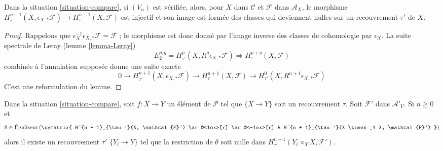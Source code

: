 \begin{lemma}
\label{lemma-V-implies-cohomology-extra-general}
Dans la situation \ref{situation-compare}, si $(V_n)$ est vérifiée, alors,
pour $X$ dans $\mathcal{C}$ et $\mathcal{F}$ dans $\mathcal{A}_X$, le morphisme
$H^{n + 1}_{\tau'}(X, \epsilon_{X, *}\mathcal{F}) \to
H^{n + 1}_\tau(X, \mathcal{F})$
est injectif et son image est formée des classes qui deviennent nulles sur
un recouvrement $\tau'$ de $X$.
\end{lemma}

\begin{proof}
Rappelons que $\epsilon_X^{-1}\epsilon_{X, *}\mathcal{F} = \mathcal{F}$ ;
le morphisme est donc donné par l'image inverse des classes de cohomologie
par $\epsilon_X$. La suite spectrale de Leray
(lemme \ref{lemma-Leray})
$$
E_2^{p, q} = H^p_{\tau'}(X, R^q\epsilon_{X, *}\mathcal{F})
\Rightarrow
H^{p + q}_\tau(X, \mathcal{F})
$$
combinée à l'annulation supposée donne une suite exacte
$$
0 \to
H^{n + 1}_{\tau'}(X, \epsilon_{X, *}\mathcal{F}) \to
H^{n + 1}_\tau(X, \mathcal{F}) \to
H^0_{\tau'}(X, R^{n + 1}\epsilon_{X, *}\mathcal{F})
$$
C'est une reformulation du lemme.
\end{proof}

\begin{lemma}
\label{lemma-make-class-zero-general}
Dans la situation \ref{situation-compare}, soit $f : X \to Y$
un élément de $\mathcal{P}$ tel que $\{X \to Y\}$ soit un recouvrement
$\tau$. Soit $\mathcal{F}'$ dans $\mathcal{A}'_Y$. Si $n \geq 0$ et
$$
\theta \in
\text{Égaliseur}\left(
\xymatrix{
H^{n + 1}_{\tau'}(X, \mathcal{F}')
\ar@<1ex>[r] \ar@<-1ex>[r] &
H^{n + 1}_{\tau'}(X \times_Y X, \mathcal{F}')
}
\right)
$$
alors il existe un recouvrement $\tau'$ $\{Y_i \to Y\}$
tel que la restriction de $\theta$ soit nulle dans
$H^{n + 1}_{\tau'}(Y_i \times_Y X, \mathcal{F}')$.
\end{lemma}

